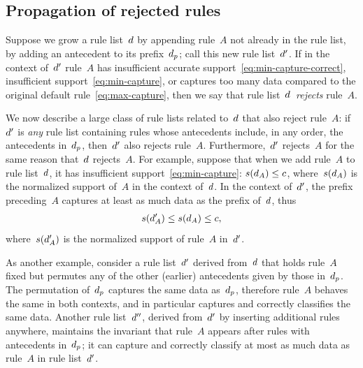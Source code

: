 \subsection{Propagation of rejected rules}

Suppose we grow a rule list~${d}$ by appending rule~$A$ not already in the rule list,
\ie by adding an antecedent to its prefix~$d_p$; call this new rule list~${d}'$.
%
If in the context of~${d}'$ rule~$A$ has insufficient accurate support~\eqref{eq:min-capture-correct},
insufficient support~\eqref{eq:min-capture},
or captures too many data compared to the original default rule~\eqref{eq:max-capture},
then we say that rule list~${d}$~\emph{rejects} rule~$A$.

We now describe a large class of rule lists related to~${d}$ that also reject rule~$A$:
if~${d}'$ is \emph{any} rule list containing rules whose antecedents include,
in any order, the antecedents in~$d_p$, then~${d}'$ also rejects rule~$A$.
%
Furthermore,~${d}'$ rejects~$A$ for the same reason that~${d}$ rejects~$A$.
%
For example, suppose that when we add rule~$A$ to rule list~${d}$,
it has insufficient support~\eqref{eq:min-capture}: ${s({d}_A) \le c}$,
where~$s({d}_A)$ is the normalized support of~$A$ in the context of~${d}$.
%
In the context of~${d}'$, the prefix preceding~$A$ captures at least
as much data as the prefix of~${d}$, thus
\begin{align}
s(\RL'_A) \le s(\RL_A) \le c,
\end{align}
where~$s({d}'_A)$ is the normalized support of rule~$A$ in~${d}'$.

As another example, consider a rule list~${d}'$ derived from~${d}$ that holds rule~$A$ fixed
but permutes any of the other (earlier) antecedents given by those in~$d_p$.
%
The permutation of~$d_p$ captures the same data as~$d_p$,
therefore rule~$A$ behaves the same in both contexts,
and in particular captures and correctly classifies the same data.
%
Another rule list~${d}''$, derived from~${d}'$ by inserting additional rules anywhere,
maintains the invariant that rule~$A$ appears after rules with antecedents in~$d_p$;
it can capture and correctly classify at most as much data as rule~$A$ in rule list~${d}'$.
%

